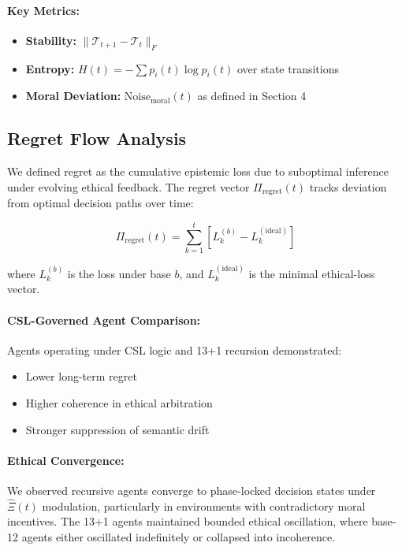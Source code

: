 \documentclass[12pt]{article}
\begin{document}
\paragraph{Key Metrics:}
\begin{itemize}
    \item \textbf{Stability:} $\| \mathcal{T}_{t+1} - \mathcal{T}_t \|_F$
    \item \textbf{Entropy:} $H(t) = -\sum p_i(t) \log p_i(t)$ over state transitions
    \item \textbf{Moral Deviation:} $\text{Noise}_{\text{moral}}(t)$ as defined in Section 4
\end{itemize}

\subsection{Regret Flow Analysis}

We defined regret as the cumulative epistemic loss due to suboptimal inference under evolving ethical feedback. The regret vector $\Pi_{\text{regret}}(t)$ tracks deviation from optimal decision paths over time:

\[
\Pi_{\text{regret}}(t) = \sum_{k=1}^{t} \left[ L^{(b)}_k - L^{(\text{ideal})}_k \right]
\]

where $L^{(b)}_k$ is the loss under base $b$, and $L^{(\text{ideal})}_k$ is the minimal ethical-loss vector.

\paragraph{CSL-Governed Agent Comparison:}
Agents operating under CSL logic and 13+1 recursion demonstrated:
\begin{itemize}
    \item Lower long-term regret
    \item Higher coherence in ethical arbitration
    \item Stronger suppression of semantic drift
\end{itemize}

\paragraph{Ethical Convergence:}
We observed recursive agents converge to phase-locked decision states under $\hat{\Xi}(t)$ modulation, particularly in environments with contradictory moral incentives. The 13+1 agents maintained bounded ethical oscillation, where base-12 agents either oscillated indefinitely or collapsed into incoherence.
\end{document}
